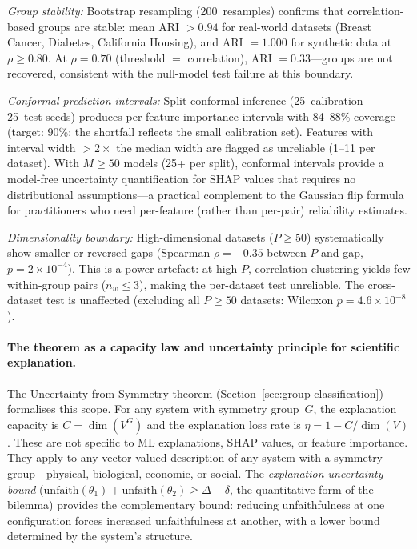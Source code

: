 \documentclass[11pt,a4paper]{article}
\begin{document}
\emph{Group stability:} Bootstrap resampling (200~resamples) confirms that correlation-based groups are stable: mean ARI $> 0.94$ for real-world datasets (Breast Cancer, Diabetes, California Housing), and ARI $= 1.000$ for synthetic data at $\rho \geq 0.80$.  At $\rho = 0.70$ (threshold $=$ correlation), ARI $= 0.33$---groups are not recovered, consistent with the null-model test failure at this boundary.

\emph{Conformal prediction intervals:}  Split conformal inference (25~calibration $+$ 25~test seeds) produces per-feature importance intervals with 84--88\% coverage (target: 90\%; the shortfall reflects the small calibration set).  Features with interval width $> 2\times$ the median width are flagged as unreliable (1--11 per dataset).  With $M \geq 50$ models (25+ per split), conformal intervals provide a model-free uncertainty quantification for SHAP values that requires no distributional assumptions---a practical complement to the Gaussian flip formula for practitioners who need per-feature (rather than per-pair) reliability estimates.

\emph{Dimensionality boundary:} High-dimensional datasets ($P \geq 50$) systematically show smaller or reversed gaps (Spearman $\rho = -0.35$ between $P$ and gap, $p = 2 \times 10^{-4}$).  This is a power artefact: at high $P$, correlation clustering yields few within-group pairs ($n_w \leq 3$), making the per-dataset test unreliable.  The cross-dataset test is unaffected (excluding all $P \geq 50$ datasets: Wilcoxon $p = 4.6 \times 10^{-8}$).

\paragraph{The theorem as a capacity law and uncertainty principle for scientific explanation.}
The Uncertainty from Symmetry theorem (Section~\ref{sec:group-classification}) formalises this scope.  For any system with symmetry group~$G$, the explanation capacity is $C = \dim(V^G)$ and the explanation loss rate is $\eta = 1 - C/\dim(V)$.  These are not specific to ML explanations, SHAP values, or feature importance.  They apply to any vector-valued description of any system with a symmetry group---physical, biological, economic, or social.  The \emph{explanation uncertainty bound} ($\mathrm{unfaith}(\theta_1) + \mathrm{unfaith}(\theta_2) \geq \Delta - \delta$, the quantitative form of the bilemma) provides the complementary bound: reducing unfaithfulness at one configuration forces increased unfaithfulness at another, with a lower bound determined by the system's structure.
\end{document}
